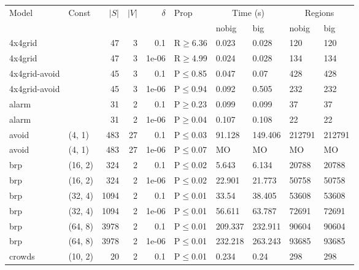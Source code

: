 \begin{longtable}{llrrrlllll}

        \toprule
        Model & Const & $|S|$ & $|V|$ & $\delta$ & Prop & \multicolumn{2}{c}{Time (s)} & \multicolumn{2}{c}{Regions} \\
        \cmidrule(ll){7-8} \cmidrule(ll){9-10}
        & & & & & & nobig & big & nobig & big \\
        \midrule
        
 4x4grid       &           &     	47 &   3 & 0.1   & R$\geq$6.36  & 0.023   & 0.028   & 120    & 120    \\
 4x4grid       &           &     	47 &   3 & 1e-06 & R$\geq$4.99  & 0.024   & 0.028   & 134    & 134    \\
 4x4grid-avoid &           &     	45 &   3 & 0.1   & P$\leq$0.85  & 0.047   & 0.07    & 428    & 428    \\
 4x4grid-avoid &           &     	45 &   3 & 1e-06 & P$\leq$0.94  & 0.092   & 0.505   & 232    & 232    \\
 alarm         &           &     	31 &   2 & 0.1   & P$\geq$0.23  & 0.099   & 0.099   & 37     & 37     \\
 alarm         &           &     	31 &   2 & 1e-06 & P$\geq$0.04  & 0.107   & 0.108   & 22     & 22     \\
 avoid         & (4, 1)    &    	483 &  27 & 0.1   & P$\leq$0.03  & 91.128  & 149.406 & 212791 & 212791 \\
 avoid         & (4, 1)    &    	483 &  27 & 1e-06 & P$\leq$0.07  & MO      & MO      & MO     & MO     \\
 brp           & (16, 2)   &    	324 &   2 & 0.1   & P$\leq$0.02  & 5.643   & 6.134   & 20788  & 20788  \\
 brp           & (16, 2)   &    	324 &   2 & 1e-06 & P$\leq$0.02  & 22.901  & 21.773  & 50758  & 50758  \\
 brp           & (32, 4)   &   	1094 &   2 & 0.1   & P$\leq$0.01  & 33.54   & 38.405  & 53608  & 53608  \\
 brp           & (32, 4)   &   	1094 &   2 & 1e-06 & P$\leq$0.01  & 56.611  & 63.787  & 72691  & 72691  \\
 brp           & (64, 8)   &   	3978 &   2 & 0.1   & P$\leq$0.01  & 209.337 & 232.911 & 90604  & 90604  \\
 brp           & (64, 8)   &   	3978 &   2 & 1e-06 & P$\leq$0.01  & 232.218 & 263.243 & 93685  & 93685  \\
 crowds        & (10, 2)   &     	20 &   2 & 0.1   & P$\leq$0.01  & 0.234   & 0.24    & 298    & 298    \\

\end{longtable}
